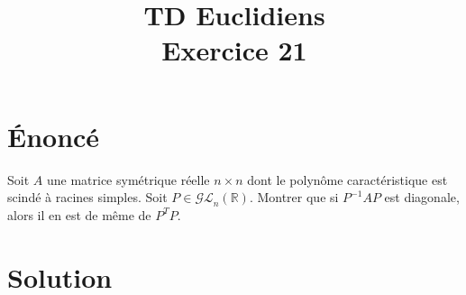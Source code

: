 \documentclass[french]{article}
\title{TD Euclidiens\\ Exercice 21}
\date{}
\newcommand{\R}{\mathbb{R}}
\newcommand{\inv}{^{-1}}
\begin{document}
\maketitle

\section{Énoncé}
Soit $A$ une matrice symétrique réelle $n\times n$ dont le polynôme caractéristique est scindé à racines simples. Soit $P\in\mathcal{GL}_n(\R)$. Montrer que si $P\inv AP$ est diagonale, alors il en est de même de $P^TP$.
\section{Solution}
\end{document}
